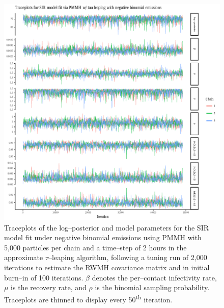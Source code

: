 \begin{figure}[htbp]
	\centering
	\includegraphics[width=\linewidth]{figures/bbs_sir_pmmh_negbinom_traceplots.pdf}
	\caption{Traceplots of the log--posterior and model parameters for the SIR model fit under negative binomial emissions using PMMH with 5,000 particles per chain and a time--step of 2 hours in the approximate $ \tau $--leaping algorithm, following a tuning run of 2,000 iterations to estimate the RWMH covariance matrix and in initial burn--in of 100 iterations. $ \beta $ denotes the per--contact infectivity rate, $ \mu $ is the recovery rate, and $ \rho $ is the binomial sampling probability. Traceplots are thinned to display every 50\textsuperscript{th} iteration.}
	\label{fig:bbs_sir_pmmh_negbinom_traceplots}
\end{figure}

